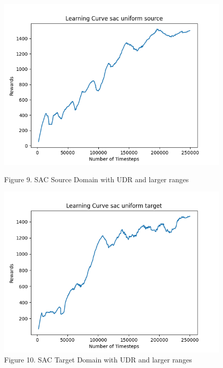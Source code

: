 \documentclass[12pt]{article}
\begin{document}
\begin{figure}[H]
    \centering
    \begin{minipage}{0.45\textwidth}
        \centering
        \includegraphics[width=\textwidth]{../images/Learning_Curve_SAC_Uniform_Medium_Source.png}
        \caption{Figure 9. SAC Source Domain with UDR and larger ranges}
        \label{fig:sac_source_udr_larger}
    \end{minipage}
    \hfill
    \begin{minipage}{0.45\textwidth}
        \centering
        \includegraphics[width=\textwidth]{../images/Learning_Curve_SAC_Uniform_Medium_Target.png}
        \caption{Figure 10. SAC Target Domain with UDR and larger ranges}
        \label{fig:sac_target_udr_larger}

\end{minipage}
\end{figure}
\end{document}
